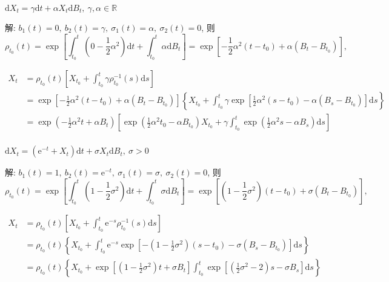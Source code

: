 \documentclass[openany]{ctexbook}
\theoremstyle{kaiti}
\theoremstyle{normal}
\begin{document}
$\mathrm{d}X_t=\gamma\mathrm{d}t+\alpha X_t\mathrm{d}B_t,~\gamma,\alpha\in\mathbb{R}$

解: $b_1(t)=0,~b_2(t)=\gamma,~\sigma_1(t)=\alpha,~\sigma_2(t)=0$, 则
\begin{equation}
  \rho_{t_0}(t)=\exp\left[\int_{t_0}^t\left(0-\frac{1}{2}\alpha^2\right)\mathrm{d}t+\int_{t_0}^t\alpha \mathrm{d}B_t\right]=\exp\left[-\frac{1}{2}\alpha^2(t-t_0)+\alpha (B_t-B_{t_0})\right],
\end{equation}

\begin{equation}
  \begin{aligned}
    X_t
    &=\rho_{t_0}(t)\left[X_{t_0}+\int_{t_0}^t\gamma\rho_{t_0}^{-1}(s)\mathrm{d}s\right]\\
    &=\exp\left[-\frac{1}{2}\alpha^2(t-t_0)+\alpha (B_t-B_{t_0})\right]\left\{X_{t_0}+\int_{t_0}^t\gamma\exp\left[\frac{1}{2}\alpha^2(s-t_0)-\alpha (B_s-B_{t_0})\right]\mathrm{d}s\right\}\\
    &=\exp\left(-\frac{1}{2}\alpha^2t+\alpha B_t\right)\left[\exp\left(\frac{1}{2}\alpha^2t_0-\alpha B_{t_0}\right)X_{t_0}+\gamma\int_{t_0}^t\exp\left(\frac{1}{2}\alpha^2s-\alpha B_s\right)\mathrm{d}s\right]\\
  \end{aligned}
\end{equation}

$\mathrm{d}X_t=(\mathrm{e}^{-t}+X_t)\mathrm{d}t+\sigma X_t\mathrm{d}B_t,~\sigma>0$

解: $b_1(t)=1,~b_2(t)=\mathrm{e}^{-t},~\sigma_1(t)=\sigma,~\sigma_2(t)=0$, 则
\begin{equation}
  \rho_{t_0}(t)=\exp\left[\int_{t_0}^t\left(1-\frac{1}{2}\sigma^2\right)\mathrm{d}t+\int_{t_0}^t\sigma \mathrm{d}B_t\right]=\exp\left[\left(1-\frac{1}{2}\sigma^2\right)(t-t_0)+\sigma (B_t-B_{t_0})\right],
\end{equation}

\begin{equation}
  \begin{aligned}
    X_t
    &=\rho_{t_0}(t)\left[X_{t_0}+\int_{t_0}^t\mathrm{e}^{-s}\rho_{t_0}^{-1}(s)\mathrm{d}s\right]\\
    &=\rho_{t_0}(t)\left\{X_{t_0}+\int_{t_0}^t\mathrm{e}^{-s}\exp\left[-\left(1-\frac{1}{2}\sigma^2\right)(s-t_0)-\sigma (B_s-B_{t_0})\right]\mathrm{d}s\right\}\\
    &=\rho_{t_0}(t)\left\{X_{t_0}+\exp\left[\left(1-\frac{1}{2}\sigma^2\right)t+\sigma B_t\right]\int_{t_0}^t\exp\left[\left(\frac{1}{2}\sigma^2-2\right)s-\sigma B_s\right]\mathrm{d}s\right\}\\
  \end{aligned}
\end{equation}
\end{document}
